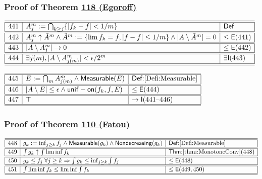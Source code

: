 \documentclass[11pt,reqno]{amsart}
\begin{document}
\medskip

\subsubsection*{Proof of Theorem \hyperlink{thm:Egoroff}{118 (\textsf{Egoroff})}}

\noindent$%
\begin{array}{|r|l|l|}
\hline\hline
441 & A_{j}^{m}:=\bigcap_{k\ge j}\{|f_{k}-f|<1/m\} & \mathsf{Def} \\ \hline\hline
442 & A_{j}^{m}\uparrow\tilde{A}^{m}\wedge\tilde{A}^{m}:=\{\lim f_{k}=f,|f-f|\le1/m\}\wedge|A\setminus\tilde{A}^{m}|=0 & \le\mathsf{E}(441) \\ \hline\hline
443 & |A\setminus A_{j}^{m}|\to0 & \le\mathsf{E}(442) \\ \hline\hline
444 & \exists j(m),|A\setminus A_{j(m)}^{m}|<\epsilon/2^{m} & \exists\mathsf{I}(443) \\ \hline\hline
\end{array}%
$

\medskip

\noindent$%
\begin{array}{|r|l|l|}
\hline\hline
445 & E:=\bigcap_{m}A_{j(m)}^{m}\wedge\mathsf{Measurable}(E) & \textsf{Def:}\ref{Defi:Measurable} \\ \hline\hline
446 & |A\setminus E|\le\epsilon\wedge\mathsf{unif-on}(f_{k},f,E) & \le\mathsf{E}(444) \\ \hline\hline
447 & \top & \to\mathsf{I}(441\text{--}446) \\ \hline\hline
\end{array}%
$

\medskip

\subsubsection*{Proof of Theorem \hyperlink{thm:Fatou}{110 (\textsf{Fatou})}}

\noindent$%
\begin{array}{|r|l|l|}
\hline\hline
448 & g_{k}:=\inf_{j\ge k}f_{j}\wedge\mathsf{Measurable}(g_{k})\wedge\mathsf{Nondecreasing}(g_{k}) & \textsf{Def:}\ref{Defi:Measurable} \\ \hline\hline
449 & \int g_{k}\uparrow\int\liminf f_{k} & \textsf{Thm:}\ref{thmi:MonotoneConv}(448) \\ \hline\hline
450 & g_{k}\le f_{j}\;\forall j\ge k\Rightarrow\int g_{k}\le\inf_{j\ge k}\int f_{j} & \le\mathsf{E}(448) \\ \hline\hline
451 & \int\liminf f_{k}\le\liminf\int f_{k} & \le\mathsf{E}(449,450) \\ \hline\hline
\end{array}%
$
\end{document}
